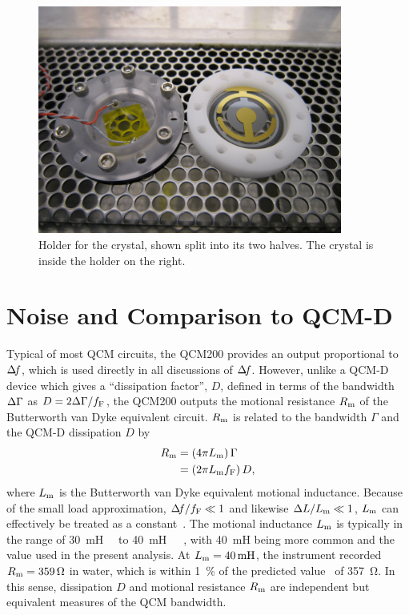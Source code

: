 \begin{figure}[ht]
\centering
\includegraphics[width=10cm,keepaspectratio]{qcm/figures/qcm_holderdiss.jpg}
\caption{Holder for the crystal, shown split into its two halves.  The
crystal is inside the holder on the right.}
\label{fig:cfqcmholder}
\end{figure}

\section{Noise and Comparison to QCM-D}\label{sec:suppqcmdcomp}
Typical of most QCM circuits, the QCM200 provides an output proportional to
$\Delta\!f$, which is used directly in all discussions of $\Delta\!f$.  However, unlike
a QCM-D device which gives a ``dissipation factor'', $D$, defined in
terms of the bandwidth $\Delta\Gamma$ as $D=2\Delta\Gamma/f_\mathrm{F}$, the QCM200
outputs the motional resistance $R_\mathrm{m}$ of the Butterworth van Dyke
equivalent circuit.  $R_\mathrm{m}$ is related to
the bandwidth $\Gamma$ and the QCM-D dissipation $D$ by
\begin{align}
 R_\mathrm{m}&=\left(4 \pi L_\mathrm{m}\right) \Gamma\\
 &=\left(2 \pi L_\mathrm{m} f_\mathrm{F}\right) D,
\end{align}
where $L_\mathrm{m}$ is the Butterworth van Dyke equivalent motional inductance.
Because of the small load approximation, $\Delta\!f/f_\mathrm{F} \ll 1$ and
likewise $\Delta L/L_\mathrm{m} \ll 1$, $L_\mathrm{m}$ can effectively be treated as a
constant~\cite{geelhood2002transient}.  The motional inductance $L_\mathrm{m}$ is
typically in the range of
\SI{30}{\milli\henry}~\cite{srsqcm200manual}~\cite{hussain2005ots} to
\SI{40}{\milli\henry}~\cite{gottschling2000detection}~\cite{arnau2002circuit}~\cite{snellings2001response},
with \SI{40}{\milli\henry} being more common and the value used in the
present analysis.  At $\Lm=\SI{40}{\milli\henry}$, the instrument recorded
$R_\mathrm{m}=\SI{359}{\ohm}$ in water, which is within \SI{1}{\percent} of the
predicted value~\cite{kanazawa1985frequency} of \SI{357}{\ohm}.  In this
sense, dissipation $D$ and motional resistance $R_\mathrm{m}$ are independent but
equivalent measures of the QCM bandwidth.

